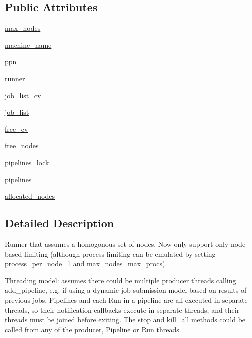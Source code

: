 \subsection*{Public Attributes}
\begin{DoxyCompactItemize}
\item 
\hyperlink{classcodar_1_1savanna_1_1consumer_1_1_pipeline_runner_af0633cf5cd30b71a59f7a5fce860df56}{max\+\_\+nodes}
\item 
\hyperlink{classcodar_1_1savanna_1_1consumer_1_1_pipeline_runner_a7f2a92cc8626dbbef1e585178162ddaa}{machine\+\_\+name}
\item 
\hyperlink{classcodar_1_1savanna_1_1consumer_1_1_pipeline_runner_a936ec7d8848c12c9c76c1390c19e4923}{ppn}
\item 
\hyperlink{classcodar_1_1savanna_1_1consumer_1_1_pipeline_runner_ac2602829f52e9355326fe46748d38e4b}{runner}
\item 
\hyperlink{classcodar_1_1savanna_1_1consumer_1_1_pipeline_runner_a3434d0d6bd47edebc969215d5bedca53}{job\+\_\+list\+\_\+cv}
\item 
\hyperlink{classcodar_1_1savanna_1_1consumer_1_1_pipeline_runner_a0f41642e362ef2d71e72bdc004185dbe}{job\+\_\+list}
\item 
\hyperlink{classcodar_1_1savanna_1_1consumer_1_1_pipeline_runner_ab95289d735adcde4da6ef3a361f03780}{free\+\_\+cv}
\item 
\hyperlink{classcodar_1_1savanna_1_1consumer_1_1_pipeline_runner_a13e86fda6566c2a958881e3b365ae7a3}{free\+\_\+nodes}
\item 
\hyperlink{classcodar_1_1savanna_1_1consumer_1_1_pipeline_runner_a4eb158f4c9f7326bea855c1d38e5f340}{pipelines\+\_\+lock}
\item 
\hyperlink{classcodar_1_1savanna_1_1consumer_1_1_pipeline_runner_a6a9ac146d408fed1b635cf1d6c3adb5a}{pipelines}
\item 
\hyperlink{classcodar_1_1savanna_1_1consumer_1_1_pipeline_runner_ae8fbcca12ce0cc295d8304c6e9daea5f}{allocated\+\_\+nodes}
\end{DoxyCompactItemize}


\subsection{Detailed Description}
\begin{DoxyVerb}Runner that assumes a homogonous set of nodes. Now only support only
node based limiting (although process limiting can be emulated by setting
process_per_node=1 and max_nodes=max_procs).

Threading model: assumes there could be multiple producer threads calling
add_pipeline, e.g. if using a dynamic job submission model based on
results of previous jobs. Pipelines and each Run in a pipeline are all
executed in separate threads, so their notification callbacks execute in
separate threads, and their threads must be joined before exiting. The
stop and kill_all methods could be called from any of the producer,
Pipeline or Run threads.\end{DoxyVerb}
 

